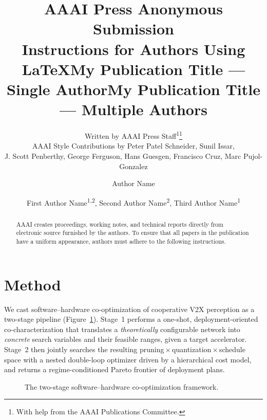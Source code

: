 \documentclass[letterpaper]{article} %
\title{AAAI Press Anonymous Submission\\Instructions for Authors Using \LaTeX{}}
\author{
    Written by AAAI Press Staff\textsuperscript{\rm 1}\thanks{With help from the AAAI Publications Committee.}\\
    AAAI Style Contributions by Peter Patel Schneider,
    Sunil Issar,\\
    J. Scott Penberthy,
    George Ferguson,
    Hans Guesgen,
    Francisco Cruz\equalcontrib\corresponding,
    Marc Pujol-Gonzalez\equalcontrib\corresponding
}
\title{My Publication Title --- Single Author}
\author {
    Author Name
}
\title{My Publication Title --- Multiple Authors}
\author {
    First Author Name\textsuperscript{\rm 1,\rm 2}\equalcontrib,
    Second Author Name\textsuperscript{\rm 2}\equalcontrib,
    Third Author Name\textsuperscript{\rm 1}\corresponding
}
\begin{document}
\maketitle

\begin{abstract}
AAAI creates proceedings, working notes, and technical reports directly from electronic source furnished by the authors. To ensure that all papers in the publication have a uniform appearance, authors must adhere to the following instructions.
\end{abstract}


\section{Method}

We cast software--hardware co-optimization of cooperative V2X perception
as a two-stage pipeline (Figure~\ref{fig:framework}). Stage~1 performs a
one-shot, deployment-oriented co-characterization that translates a
\emph{theoretically} configurable network into \emph{concrete} search
variables and their feasible ranges, given a target accelerator. Stage~2
then jointly searches the resulting
pruning\,$\times$\,quantization\,$\times$\,schedule space with a nested
double-loop optimizer driven by a hierarchical cost model, and returns a
regime-conditioned Pareto frontier of deployment plans.

\begin{figure}[t]
\centering
{}
\caption{The two-stage software--hardware co-optimization framework.}
\label{fig:framework}
\end{figure}
\end{document}
